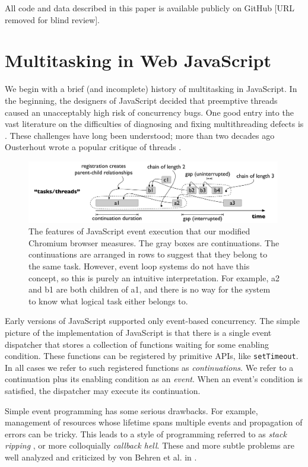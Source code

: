 \documentclass[acmsmall,anonymous,review]{acmart}\settopmatter{printfolios=true,printccs=false,printacmref=false}
\begin{document}
All code and data described in this paper is available publicly on GitHub [URL removed for blind review].

\section{Multitasking in Web JavaScript}

We begin with a brief (and incomplete) history of multitasking in JavaScript.
In the beginning, the designers of JavaScript decided that preemptive threads caused an unacceptably high risk of concurrency bugs.
One good entry into the vast literature on the difficulties of diagnosing and fixing multithreading defects is \cite{Lu2008}.
These challenges have long been understood; more than two decades ago Ousterhout wrote a popular critique of threads \cite{Ousterhout1996}.

\begin{figure}
\includegraphics[width=0.99\textwidth]{Figures/continuation_tree}
\caption{The features of JavaScript event execution that our modified Chromium browser measures.
  The gray boxes are continuations.
  The continuations are arranged in rows to suggest that they belong to the same task.
  However, event loop systems do not have this concept, so this is purely an intuitive interpretation.
  For example, \textsf{a2} and \textsf{b1} are both children of \textsf{a1}, and there is no way for the system to know what logical task either belongs to.}
\label{fig:continuation_tree}
\end{figure}

Early versions of JavaScript supported only event-based concurrency.
The simple picture of the implementation of JavaScript is that there is a single event dispatcher that stores a collection of functions waiting for some enabling condition.
These functions can be registered by primitive APIs, like \texttt{setTimeout}.
In all cases we refer to such registered functions as \emph{continuations}.
We refer to a continuation plus its enabling condition as an \emph{event}.
When an event's condition is satisfied, the dispatcher may execute its continuation.

Simple event programming has some serious drawbacks.
For example, management of resources whose lifetime spans multiple events and propagation of errors can be tricky.
This leads to a style of programming referred to as \emph{stack ripping} \cite{Adya2002}, or more colloquially \emph{callback hell}.
These and more subtle problems are well analyzed and criticized by von Behren et al. in \cite{Behren2003a}.
\end{document}
